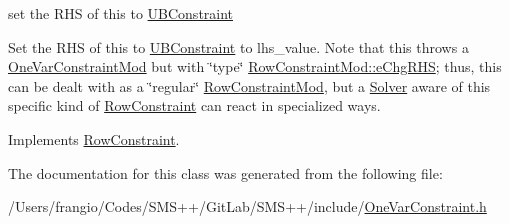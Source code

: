 set the R\+HS of this to \mbox{\hyperlink{class_s_m_spp__di__unipi__it_1_1_u_b_constraint}{U\+B\+Constraint}} 

Set the R\+HS of this to \mbox{\hyperlink{class_s_m_spp__di__unipi__it_1_1_u_b_constraint}{U\+B\+Constraint}} to lhs\+\_\+value. Note that this throws a \mbox{\hyperlink{class_s_m_spp__di__unipi__it_1_1_one_var_constraint_mod}{One\+Var\+Constraint\+Mod}} but with \char`\"{}type\char`\"{} \mbox{\hyperlink{class_s_m_spp__di__unipi__it_1_1_row_constraint_mod_af91e41a206e988d55a31347acd6f5d33a6c90a5d6f098c2913eef0d4058b65b1f}{Row\+Constraint\+Mod\+::e\+Chg\+R\+HS}}; thus, this can be dealt with as a \char`\"{}regular\char`\"{} \mbox{\hyperlink{class_s_m_spp__di__unipi__it_1_1_row_constraint_mod}{Row\+Constraint\+Mod}}, but a \mbox{\hyperlink{class_s_m_spp__di__unipi__it_1_1_solver}{Solver}} aware of this specific kind of \mbox{\hyperlink{class_s_m_spp__di__unipi__it_1_1_row_constraint}{Row\+Constraint}} can react in specialized ways. 

Implements \mbox{\hyperlink{class_s_m_spp__di__unipi__it_1_1_row_constraint_a42d5ec40966a094c7fa805a5ea44337b}{Row\+Constraint}}.



The documentation for this class was generated from the following file\+:\begin{DoxyCompactItemize}
\item 
/\+Users/frangio/\+Codes/\+S\+M\+S++/\+Git\+Lab/\+S\+M\+S++/include/\mbox{\hyperlink{_one_var_constraint_8h}{One\+Var\+Constraint.\+h}}\end{DoxyCompactItemize}
